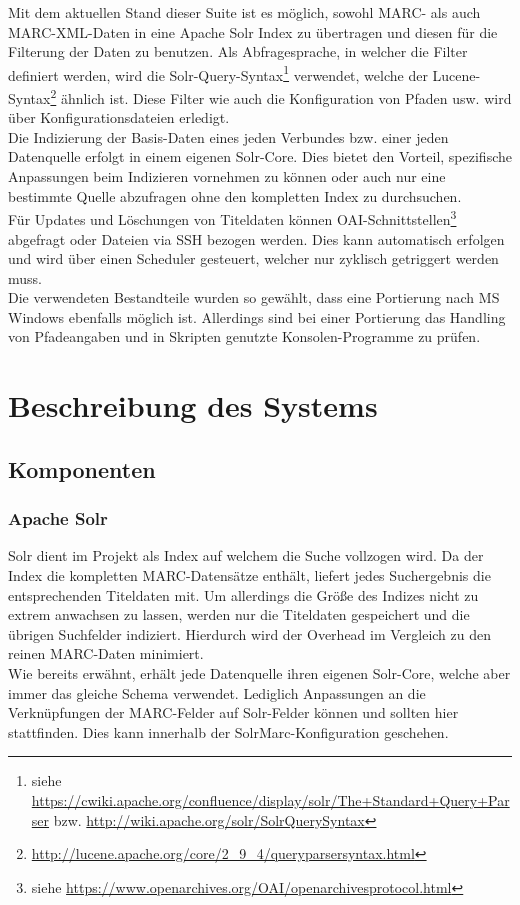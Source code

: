 \documentclass[10pt]{article}
\begin{document}
Mit dem aktuellen Stand dieser Suite ist es möglich, sowohl MARC- als auch MARC-XML-Daten in eine Apache Solr Index zu übertragen und diesen für die Filterung der Daten zu benutzen. Als Abfragesprache, in welcher die Filter definiert werden, wird die Solr-Query-Syntax\footnote{siehe \url{https://cwiki.apache.org/confluence/display/solr/The+Standard+Query+Parser} bzw. \url{http://wiki.apache.org/solr/SolrQuerySyntax}} verwendet, welche der Lucene-Syntax\footnote{\url{http://lucene.apache.org/core/2_9_4/queryparsersyntax.html}} ähnlich ist. Diese Filter wie auch die Konfiguration von Pfaden usw. wird über Konfigurationsdateien erledigt. \\
Die Indizierung der Basis-Daten eines jeden Verbundes bzw. einer jeden Datenquelle erfolgt in einem eigenen Solr-Core. Dies bietet den Vorteil, spezifische Anpassungen beim Indizieren vornehmen zu können oder auch nur eine bestimmte Quelle abzufragen ohne den kompletten Index zu durchsuchen. \\
Für Updates und Löschungen von Titeldaten können OAI-Schnittstellen\footnote{siehe \url{https://www.openarchives.org/OAI/openarchivesprotocol.html}} abgefragt oder Dateien via SSH bezogen werden. Dies kann automatisch erfolgen und wird über einen Scheduler gesteuert, welcher nur zyklisch getriggert werden muss. \\
Die verwendeten Bestandteile wurden so gewählt, dass eine Portierung nach MS Windows ebenfalls möglich ist. Allerdings sind bei einer Portierung das Handling von Pfadeangaben und in Skripten genutzte Konsolen-Programme zu prüfen.

\newpage
\section{Beschreibung des Systems}
\subsection{Komponenten}
\subsubsection{Apache Solr}
Solr dient im Projekt als Index auf welchem die Suche vollzogen wird. Da der Index die kompletten MARC-Datensätze enthält, liefert jedes Suchergebnis die entsprechenden Titeldaten mit. Um allerdings die Größe des Indizes nicht zu extrem anwachsen zu lassen, werden nur die Titeldaten gespeichert und die übrigen Suchfelder indiziert. Hierdurch wird der Overhead im Vergleich zu den reinen MARC-Daten minimiert. \\
Wie bereits erwähnt, erhält jede Datenquelle ihren eigenen Solr-Core, welche aber immer das gleiche Schema verwendet. Lediglich Anpassungen an die Verknüpfungen der MARC-Felder auf Solr-Felder können und sollten hier stattfinden. Dies kann innerhalb der SolrMarc-Konfiguration geschehen.
\end{document}
